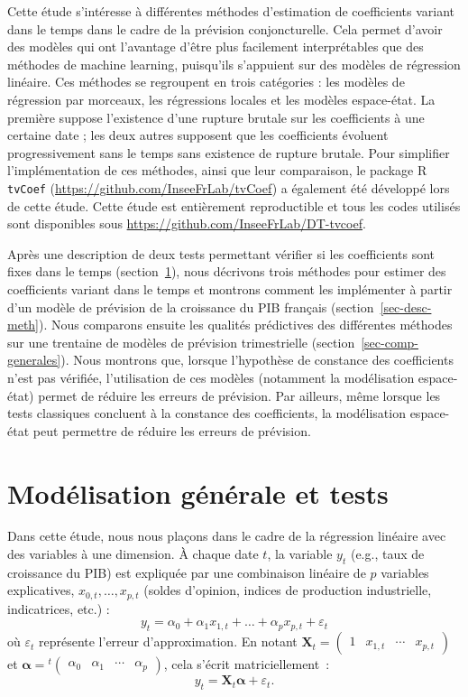 \documentclass[
  a4paper,
  DIV=11,
  numbers=noendperiod,
  french]{scrartcl}
\newcommand\1{{\mathds 1}}
\newcommand{\transp}[1]{{}^t\!#1}
\newcommand{\bf}[1]{{\boldsymbol #1}}
\theoremstyle{remark}
\begin{document}
Cette étude s'intéresse à différentes méthodes d'estimation de
coefficients variant dans le temps dans le cadre de la prévision
conjoncturelle. Cela permet d'avoir des modèles qui ont l'avantage
d'être plus facilement interprétables que des méthodes de machine
learning, puisqu'ils s'appuient sur des modèles de régression linéaire.
Ces méthodes se regroupent en trois catégories : les modèles de
régression par morceaux, les régressions locales et les modèles
espace-état. La première suppose l'existence d'une rupture brutale sur
les coefficients à une certaine date ; les deux autres supposent que les
coefficients évoluent progressivement sans le temps sans existence de
rupture brutale. Pour simplifier l'implémentation de ces méthodes, ainsi
que leur comparaison, le package R \texttt{tvCoef}
(\url{https://github.com/InseeFrLab/tvCoef}) a également été développé
lors de cette étude. Cette étude est entièrement reproductible et tous
les codes utilisés sont disponibles sous
\url{https://github.com/InseeFrLab/DT-tvcoef}.

Après une description de deux tests permettant vérifier si les
coefficients sont fixes dans le temps (section~\ref{sec-tests}), nous
décrivons trois méthodes pour estimer des coefficients variant dans le
temps et montrons comment les implémenter à partir d'un modèle de
prévision de la croissance du PIB français
(section~\ref{sec-desc-meth}). Nous comparons ensuite les qualités
prédictives des différentes méthodes sur une trentaine de modèles de
prévision trimestrielle (section~\ref{sec-comp-generales}). Nous
montrons que, lorsque l'hypothèse de constance des coefficients n'est
pas vérifiée, l'utilisation de ces modèles (notamment la modélisation
espace-état) permet de réduire les erreurs de prévision. Par ailleurs,
même lorsque les tests classiques concluent à la constance des
coefficients, la modélisation espace-état peut permettre de réduire les
erreurs de prévision.

\section{Modélisation générale et tests}\label{sec-tests}

Dans cette étude, nous nous plaçons dans le cadre de la régression
linéaire avec des variables à une dimension. À chaque date \(t\), la
variable \(y_t\) (e.g., taux de croissance du PIB) est expliquée par une
combinaison linéaire de \(p\) variables explicatives,
\(x_{0,t},\dots,x_{p,t}\) (soldes d'opinion, indices de production
industrielle, indicatrices, etc.) : \[
y_t=\alpha_{0}+\alpha_{1} x_{1,t}+\dots+\alpha_{p} x_{p,t} +\varepsilon_t 
\] où \(\varepsilon_t\) représente l'erreur d'approximation. En notant
\({\bf X}_t=\begin{pmatrix}1 & x_{1,t} &\cdots & x_{p,t} \end{pmatrix}\)
et
\({\bf \alpha}=\transp{\begin{pmatrix}\alpha_0 & \alpha_1 &\cdots & \alpha_p \end{pmatrix}}\),
cela s'écrit matriciellement~: \[
y_t={\bf X_t} \bf\alpha +\varepsilon_t.
\]
\end{document}
